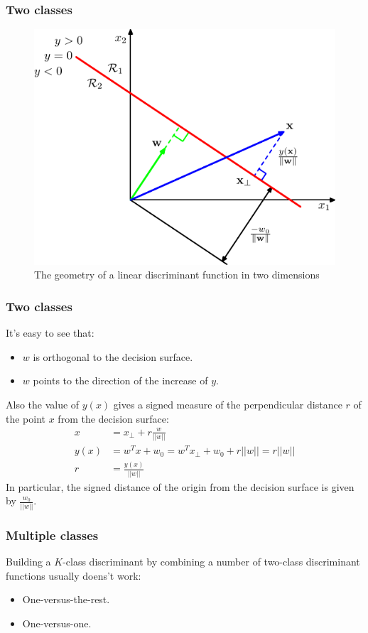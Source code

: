 \documentclass{beamer}
\begin{document}
\begin{frame}
    \frametitle{Two classes}
    \begin{figure}
        \caption{The geometry of a linear discriminant function in two dimensions}
        \includegraphics[height=0.6\textheight]{Figure_1.pdf}
    \end{figure}
\end{frame}

\begin{frame}
    \frametitle{Two classes}
    It's easy to see that:
    \begin{itemize}
        \item $w$ is orthogonal to the decision surface.
        \item $w$ points to the direction of the increase of $y$.
    \end{itemize}
    Also the value of $y(x)$ gives a signed measure of the perpendicular distance $r$ of the point $x$ from the decision surface:
    \begin{align*}
        x&=x_{\perp}+r\frac{w}{||w||} \\
        y(x)&=w^{T}x+w_{0}=w^{T}x_{\perp}+w_{0}+r||w||=r||w|| \\
        r&=\frac{y(x)}{||w||}
    \end{align*}
    In particular, the signed distance of the origin from the decision surface is given by $\frac{w_{0}}{||w||}$.
\end{frame}

\begin{frame}
    \frametitle{Multiple classes}
    Building a $K$-class discriminant by combining a number of two-class discriminant functions usually doens't work:
    \begin{itemize}
        \item One-versus-the-rest.
        \item One-versus-one.
    \end{itemize}
\end{frame}
\end{document}
